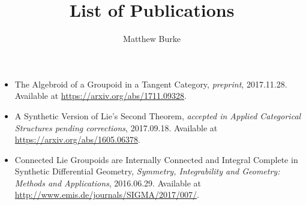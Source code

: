 \documentclass[10pt]{article}
\date{}
\author{Matthew Burke}
\title{List of Publications}
\begin{document}
\maketitle
\begin{itemize}
    \item The Algebroid of a Groupoid in a Tangent Category, \emph{preprint}, 2017.11.28. Available at \url{https://arxiv.org/abs/1711.09328}.
    \item A Synthetic Version of Lie's Second Theorem, \emph{accepted in Applied Categorical Structures pending corrections}, 2017.09.18. Available at \url{https://arxiv.org/abs/1605.06378}.
    \item Connected Lie Groupoids are Internally Connected and Integral Complete in Synthetic Differential Geometry, \emph{Symmetry, Integrability and Geometry: Methods and Applications}, 2016.06.29. Available at \url{http://www.emis.de/journals/SIGMA/2017/007/}.
\end{itemize}
\end{document}

